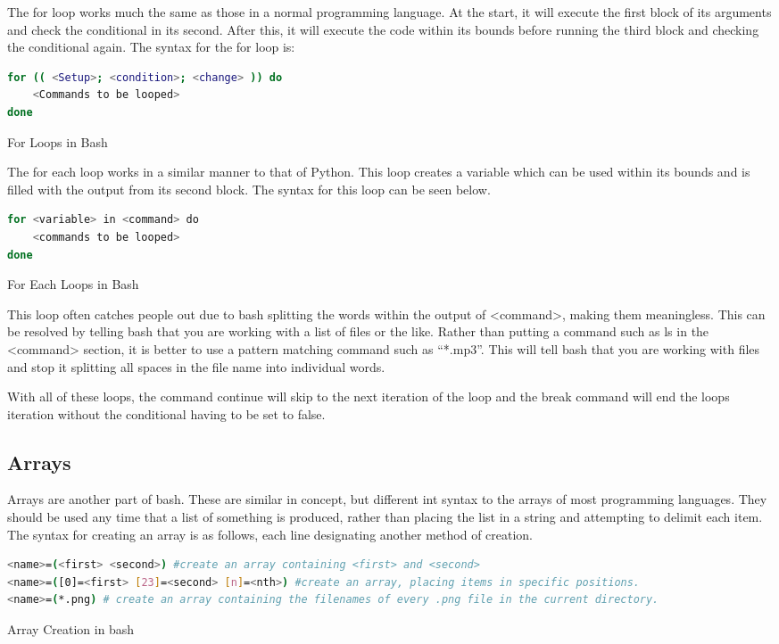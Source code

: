 			The for loop works much the same as those in a normal programming language. 
			At the start, it will execute the first block of its arguments and check the conditional in its second. 
			After this, it will execute the code within its bounds before running the third block and checking the conditional again. 
			The syntax for the for loop is:
			\begin{code}
			\begin{lstlisting}[language=bash]
for (( <Setup>; <condition>; <change> )) do
	<Commands to be looped>
done
			\end{lstlisting}
			\label{code:ForLoopBash}
			\caption{For Loops in Bash}
			\end{code}
			The for each loop works in a similar manner to that of Python. 
			This loop creates a variable which can be used within its bounds and is filled with the output from its second block. 
			The syntax for this loop can be seen below. 
			\begin{code}
			\begin{lstlisting}[language=bash]
for <variable> in <command> do
	<commands to be looped>
done
			\end{lstlisting}
			\label{code:ForEachBash}
			\caption{For Each Loops in Bash}
			\end{code}
			This loop often catches people out due to bash splitting the words within the output of <command>, making them meaningless. 
			This can be resolved by telling bash that you are working with a list of files or the like. 
			Rather than putting a command such as ls in the <command> section, it is better to use a pattern matching command such as ``*.mp3''. 
			This will tell bash that you are working with files and stop it splitting all spaces in the file name into individual words. 

			With all of these loops, the command continue will skip to the next iteration of the loop and the break command will end the loops iteration without the conditional having to be set to false. 

		\subsection{Arrays}
			Arrays are another part of bash. 
			These are similar in concept, but different int syntax to the arrays of most programming languages. 
			They should be used any time that a list of something is produced, rather than placing the list in a string and attempting to delimit each item. 
			The syntax for creating an array is as follows, each line designating another method of creation. 
			\begin{code}
			\begin{lstlisting}[language=bash]
<name>=(<first> <second>) #create an array containing <first> and <second>
<name>=([0]=<first> [23]=<second> [n]=<nth>) #create an array, placing items in specific positions. 
<name>=(*.png) # create an array containing the filenames of every .png file in the current directory. 
			\end{lstlisting}
			\label{code:ArrayCreationBash}
			\caption{Array Creation in bash}
			\end{code}

